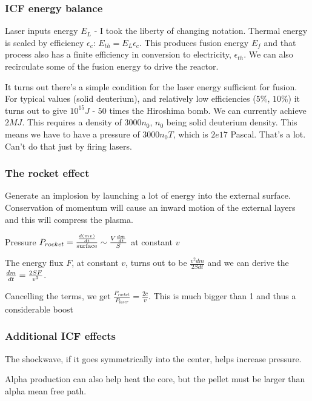 \documentclass[PlasmaNotes.tex]{subfiles}
\begin{document}
\subsubsection{ICF energy balance}

Laser inputs energy $E_L$ - I took the liberty of changing notation. Thermal energy is scaled by efficiency $\epsilon_c$: $E_{th}=E_L \epsilon_c$. This produces fusion energy $E_f$ and that process also has a finite efficiency in conversion to electricity, $\epsilon_{th}$. We can also recirculate some of the fusion energy to drive the reactor.


It turns out there's a simple condition for the laser energy sufficient for fusion. For typical values (solid deuterium), and relatively low efficiencies ($5\%$, $10\%$) it turns out to give $10^{15} J$ - $50$ times the Hiroshima bomb. We can currently achieve $2 MJ$. This requires a density of $3000 n_0$, $n_0$ being solid deuterium density. This means we have to have a pressure of $3000 n_0 T$, which is $2e17$ Pascal. That's a lot. Can't do that just by firing lasers.

\subsubsection{The rocket effect}

Generate an implosion by launching a lot of energy into the external surface. Conservation of momentum will cause an inward motion of the external layers and this will compress the plasma.

Pressure $P_{rocket} = \frac{\frac{d (mv)}{d t}}{\text{surface}} \sim \frac{V \frac{d m}{d t}}{S}$ at constant $v$

The energy flux $F$, at constant $v$, turns out to be $\frac{v^2 dm}{2 S dt}$ and we can derive the $\frac{d m}{d t} = \frac{2 S F}{v^2}$.

Cancelling the terms, we get $\frac{P_{rocket}}{P_{laser}} = \frac{2c}{v}$. This is much bigger than 1 and thus a considerable boost

\subsubsection{Additional ICF effects}

The shockwave, if it goes symmetrically into the center, helps increase pressure.

Alpha production can also help heat the core, but the pellet must be larger than alpha mean free path.
\end{document}
